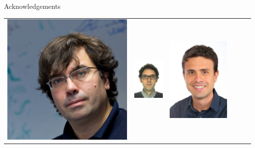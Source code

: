 \documentclass[xcolor=table,aspectratio=169]{beamer}
\numberwithin{equation}{section}
\begin{document}
\begin{frame}{Acknowledgements}
   \begin{center}
      \footnotesize
      \begin{tabularx}{\textwidth}{CCCCCC}
         \includegraphics[height = 0.2\paperheight]{figures/nicola_marzari.jpg}   &
         \includegraphics[height = 0.2\paperheight]{figures/nicola_colonna.png}   &
         \includegraphics[height = 0.2\paperheight]{figures/yannick_schubert.jpg} &

\end{tabularx}
\end{center}
\end{frame}
\end{document}
